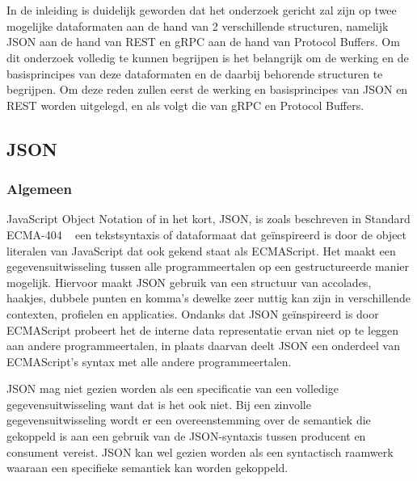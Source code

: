 \chapter{}
\label{ch:stand-van-zaken}



In de inleiding is duidelijk geworden dat het onderzoek gericht zal zijn op twee mogelijke dataformaten aan de hand van 2 verschillende structuren, namelijk JSON aan de hand van REST en gRPC aan de hand van Protocol Buffers. Om dit onderzoek volledig te kunnen begrijpen is het belangrijk om de werking en de basisprincipes van deze dataformaten en de daarbij behorende structuren te begrijpen. Om deze reden zullen eerst de werking en basisprincipes van JSON en REST worden uitgelegd, en als volgt die van gRPC en Protocol Buffers.

\section{JSON}
\label{sec:JSON}

\subsection{Algemeen}
\label{subsec:Algemeen}

JavaScript Object Notation of in het kort, JSON, is zoals beschreven in Standard ECMA-404 ~\autocite{Json2017} een tekstsyntaxis of dataformaat dat geïnspireerd is door de object literalen van JavaScript dat ook gekend staat als ECMAScript. Het maakt een gegevensuitwisseling tussen alle programmeertalen op een gestructureerde manier mogelijk. Hiervoor maakt JSON gebruik van een structuur van accolades, haakjes, dubbele punten en komma's dewelke zeer nuttig kan zijn in verschillende contexten, profielen en applicaties. Ondanks dat JSON geïnspireerd is door ECMAScript probeert het de interne data representatie ervan niet op te leggen aan andere programmeertalen, in plaats daarvan deelt JSON een onderdeel van ECMAScript's syntax met alle andere programmeertalen. 

JSON mag niet gezien worden als een specificatie van een volledige gegevensuitwisseling want dat is het ook niet. Bij een zinvolle gegevensuitwisseling wordt er een overeenstemming over de semantiek die gekoppeld is aan een gebruik van de JSON-syntaxis tussen producent en consument vereist. JSON kan wel gezien worden als een syntactisch raamwerk waaraan een specifieke semantiek kan worden gekoppeld.

